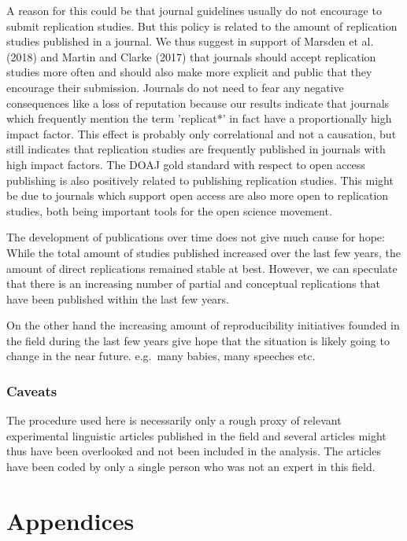 \documentclass[]{elsarticle} %
\begin{document}
A reason for this could be that journal guidelines usually do not
encourage to submit replication studies. But this policy is related to
the amount of replication studies published in a journal. We thus
suggest in support of Marsden et al. (2018) and Martin and Clarke (2017)
that journals should accept replication studies more often and should
also make more explicit and public that they encourage their submission.
Journals do not need to fear any negative consequences like a loss of
reputation because our results indicate that journals which frequently
mention the term 'replicat*' in fact have a proportionally high impact
factor. This effect is probably only correlational and not a causation,
but still indicates that replication studies are frequently published in
journals with high impact factors. The DOAJ gold standard with respect
to open access publishing is also positively related to publishing
replication studies. This might be due to journals which support open
access are also more open to replication studies, both being important
tools for the open science movement.

The development of publications over time does not give much cause for
hope: While the total amount of studies published increased over the
last few years, the amount of direct replications remained stable at
best. However, we can speculate that there is an increasing number of
partial and conceptual replications that have been published within the
last few years.

On the other hand the increasing amount of reproducibility initiatives
founded in the field during the last few years give hope that the
situation is likely going to change in the near future. e.g.~many
babies, many speeches etc.

\hypertarget{caveats}{%
\subsubsection{Caveats}\label{caveats}}

The procedure used here is necessarily only a rough proxy of relevant
experimental linguistic articles published in the field and several
articles might thus have been overlooked and not been included in the
analysis. The articles have been coded by only a single person who was
not an expert in this field.

\hypertarget{appendices}{%
\section{Appendices}\label{appendices}}
\end{document}
